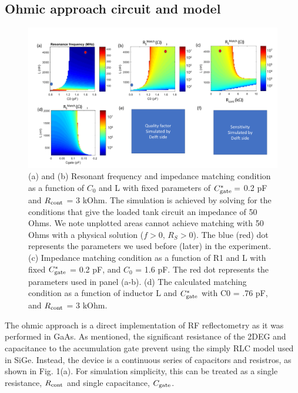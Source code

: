 \documentclass[]{article}
\begin{document}
\subsection{Ohmic approach circuit and model} %


\begin{figure}[h]
	\includegraphics[width = \textwidth]{Illustrations/HarvardFigure2_v5.pdf}		
	\caption{(a) and (b) Resonant frequency and impedance matching condition as a function of $C_0$ and L with fixed parameters of $C^*_{\rm gate} =$ 0.2 pF and $R_{\rm cont}$ = 3 kOhm. The simulation is achieved by solving for the conditions that give the loaded tank circuit an impedance of 50 Ohms. We note unplotted areas cannot achieve matching with 50 Ohms with a physical solution ($f>0$, $R_S>0$). The blue (red) dot represents the parameters we used before (later) in the experiment. 
		(c) Impedance matching condition as a function of R1 and L with fixed $C^*_{\rm gate}$ = 0.2 pF, and $C_0$ = 1.6 pF. The red dot represents the parameters used in panel (a-b). 
		(d) The calculated matching condition as a function of inductor L and  $C^*_{\rm gate}$ with C0 = .76 pF, and $R_{\rm cont}$ = 3 kOhm. }
	\label{fig:HarvardTheory}
\end{figure}



	\label{sub:ohmic_approach_circuit_and_model}
	
	The ohmic approach is a direct implementation of RF reflectometry as it was performed in GaAs.  As mentioned, the significant resistance of the 2DEG and capacitance to the accumulation gate prevent using the simply RLC model used in SiGe.  Instead, the device is a continuous series of capacitors and resistros, as shown in Fig. 1(a).  For simulation simplicity, this can be treated as a single resistance, $R_{\rm cont}$ and single capacitance, $C_{\rm gate}$.
	
\end{document}
